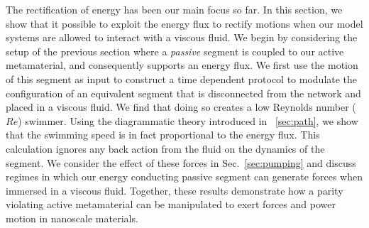 \documentclass[
 preprint,
 preprintnumbers,
 amsmath,amssymb,
 aps,
 pre,
 longbibliography,
 superscriptaddress,
 10pt, twocolumn
]{revtex4-1}
\begin{document}
The rectification of energy has been our main focus so far. In this section, we show that it possible to exploit the energy flux to rectify motions when our model systems are allowed to interact with a viscous fluid.
We begin by considering the setup of the previous section where a {\it passive} segment is coupled to our active metamaterial, and consequently supports an energy flux.
We first use the motion of this segment as input to construct a time dependent protocol to modulate the configuration of an equivalent segment that is disconnected from the network and placed in a viscous fluid. We find that doing so creates a low Reynolds number ($Re$) swimmer. Using the diagrammatic theory introduced in \secname~\ref{sec:path}, we show that the swimming speed is in fact proportional to the energy flux. This calculation ignores any back action from the fluid on the dynamics of the segment. We consider the effect of these forces in Sec.~\ref{sec:pumping} and discuss regimes in which our energy conducting passive segment can generate forces when immersed in a viscous fluid. Together, these results demonstrate how a parity violating active metamaterial can be manipulated to exert forces and power motion in nanoscale materials.  
\end{document}
